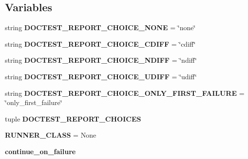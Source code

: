 \subsection*{Variables}
\begin{DoxyCompactItemize}
\item 
\mbox{\label{namespace__pytest_1_1doctest_a87f2062f0432d6c624f59e6f7314252b}} 
string {\bfseries D\+O\+C\+T\+E\+S\+T\+\_\+\+R\+E\+P\+O\+R\+T\+\_\+\+C\+H\+O\+I\+C\+E\+\_\+\+N\+O\+NE} = \char`\"{}none\char`\"{}
\item 
\mbox{\label{namespace__pytest_1_1doctest_a6cea041d8854676090334bfa31abd495}} 
string {\bfseries D\+O\+C\+T\+E\+S\+T\+\_\+\+R\+E\+P\+O\+R\+T\+\_\+\+C\+H\+O\+I\+C\+E\+\_\+\+C\+D\+I\+FF} = \char`\"{}cdiff\char`\"{}
\item 
\mbox{\label{namespace__pytest_1_1doctest_a889d536c5bf70f78ae1cb0906c9c6f71}} 
string {\bfseries D\+O\+C\+T\+E\+S\+T\+\_\+\+R\+E\+P\+O\+R\+T\+\_\+\+C\+H\+O\+I\+C\+E\+\_\+\+N\+D\+I\+FF} = \char`\"{}ndiff\char`\"{}
\item 
\mbox{\label{namespace__pytest_1_1doctest_abccdcd414189264b757a281b1338b4eb}} 
string {\bfseries D\+O\+C\+T\+E\+S\+T\+\_\+\+R\+E\+P\+O\+R\+T\+\_\+\+C\+H\+O\+I\+C\+E\+\_\+\+U\+D\+I\+FF} = \char`\"{}udiff\char`\"{}
\item 
\mbox{\label{namespace__pytest_1_1doctest_a1be5033c78dfd3b30749c46d5aa80604}} 
string {\bfseries D\+O\+C\+T\+E\+S\+T\+\_\+\+R\+E\+P\+O\+R\+T\+\_\+\+C\+H\+O\+I\+C\+E\+\_\+\+O\+N\+L\+Y\+\_\+\+F\+I\+R\+S\+T\+\_\+\+F\+A\+I\+L\+U\+RE} = \char`\"{}only\+\_\+first\+\_\+failure\char`\"{}
\item 
tuple {\bfseries D\+O\+C\+T\+E\+S\+T\+\_\+\+R\+E\+P\+O\+R\+T\+\_\+\+C\+H\+O\+I\+C\+ES}
\item 
\mbox{\label{namespace__pytest_1_1doctest_affda192ebba43ff9dd0807d6d7aff701}} 
{\bfseries R\+U\+N\+N\+E\+R\+\_\+\+C\+L\+A\+SS} = None
\item 
\mbox{\label{namespace__pytest_1_1doctest_a7506906e8649e20b96b8b69f2391c543}} 
{\bfseries continue\+\_\+on\+\_\+failure}
\end{DoxyCompactItemize}


